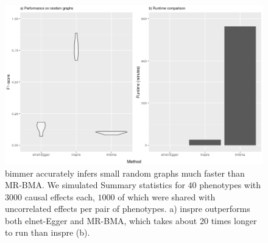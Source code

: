 \documentclass{article}
\begin{document}
\newpage
\begin{figure}[H]\label{figureS4}
\includegraphics[width=\textwidth]{figures/figure_S4.png}
\caption{bimmer accurately infers small random graphs much faster than MR-BMA. We simulated
Summary statistics for $40$ phenotypes with $3000$ causal
effects each, $1000$ of which were shared with uncorrelated effects per pair of phenotypes.
a) inspre outperforms both elnet-Egger and MR-BMA, which takes about 20 times
longer to run than inspre (b).
}
\end{figure}
\end{document}
